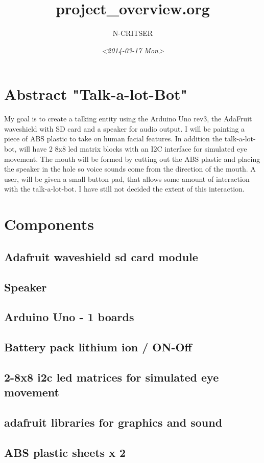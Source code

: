 \documentclass[a4paper,6pt]{article}
\author{N-CRITSER}
\date{\textit{<2014-03-17 Mon>}}
\title{project\_overview.org}
\begin{document}
\maketitle

\section{Abstract "Talk-a-lot-Bot"}
\label{sec-1}
  My goal is to create a talking entity using the Arduino Uno rev3, the AdaFruit
waveshield with SD card and a speaker for audio output.  I will be painting a 
piece of ABS plastic to take on human facial features. In addition the 
talk-a-lot-bot, will have 2 8x8 led matrix blocks with an I2C interface for 
simulated eye movement.  The mouth will be formed by cutting out the ABS plastic
and placing the speaker in the hole so voice sounds come from the direction of the 
mouth.  A user, will be given a small button pad, that allows some amount 
of interaction with the talk-a-lot-bot.  I have still not decided the extent of 
this interaction.     
\section{Components}
\label{sec-2}
\subsection{Adafruit waveshield sd card module}
\label{sec-2-1}
\subsection{Speaker}
\label{sec-2-2}
\subsection{Arduino Uno - 1 boards}
\label{sec-2-3}
\subsection{Battery pack lithium ion / ON-Off}
\label{sec-2-4}
\subsection{2-8x8 i2c led matrices for simulated eye movement}
\label{sec-2-5}
\subsection{adafruit libraries for graphics and sound}
\label{sec-2-6}
\subsection{ABS plastic sheets x 2}
\label{sec-2-7}
\end{document}
